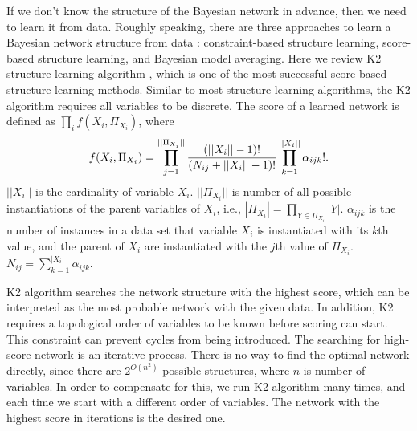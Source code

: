 If we don't know the structure of the Bayesian network in advance, then we need to learn it from data. Roughly speaking, there are three approaches to learn a Bayesian network structure from data \citep[see][chap.~18]{PGM_2009}: constraint-based structure learning, score-based structure learning, and Bayesian model averaging. Here we review K2 structure learning algorithm \citep{K2}, which is one of the most successful score-based structure learning methods. Similar to most structure learning algorithms, the K2 algorithm requires all variables to be discrete. The score of a learned network is defined as $\prod_i f(X_i, \Pi_{X_i})$, where
\begin{align}
f(X_i, \Pi_{X_i}) = \prod_{j=1}^{||\Pi_{X_i}||} {{(||X_i||-1)!}\over{(N_{ij} + ||X_i||-1)!}} \prod_{k=1}^{||X_i||} \alpha_{ijk}!.
\end{align}
$||X_i||$ is the cardinality of variable $X_i$. $||\Pi_{X_i}||$ is number of all possible instantiations of the parent variables of $X_i$, i.e., $|\Pi_{X_i}| = \prod_{Y \in \Pi_{X_i}} |Y|$. $\alpha_{ijk}$ is the number of instances in a data set that variable $X_i$ is instantiated with its $k$th value, and the parent of $X_i$ are instantiated with the $j$th value of $\Pi_{X_i}$. $N_{ij} = \sum_{k=1}^{|X_i|} \alpha_{ijk}$. 

K2 algorithm searches the network structure with the highest score, which can be interpreted as the most probable network with the given data. In addition, K2 requires a topological order of variables to be known before scoring can start. This constraint can prevent cycles from being introduced. The searching for high-score network is an iterative process. There is no way to find the optimal network directly, since there are $2^{O(n^2)}$ possible structures, where $n$ is number of variables. In order to compensate for this, we run K2 algorithm many times, and each time we start with a different order of variables. The network with the highest score in iterations is the desired one.

